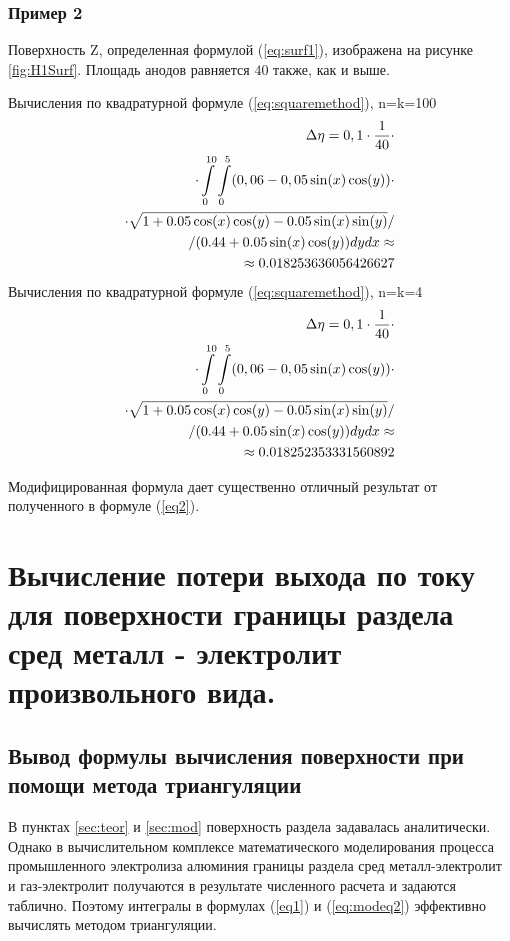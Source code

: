 \documentclass{article}
\begin{document}
\subsubsection*{Пример 2}

Поверхность Z, определенная формулой (\ref{eq:surf1}), изображена на рисунке \ref{fig:H1Surf}. Площадь анодов равняется $40$ также, как и выше.

Вычисления по квадратурной формуле (\ref{eq:squaremethod}), n=k=100
\begin{align}
\Delta \eta = 0,1 \cdot \frac{1}{40} \cdot \notag \\
\cdot \int\limits_0^{10} \int\limits_0^5 (0,06 - 0,05 \sin(x)\cos(y)) \cdot \notag \\
\cdot \sqrt{1+0.05 \cos(x)\cos(y)-0.05 \sin(x)\sin(y)}/ \notag \\
/(0.44 + 0.05 \sin(x)\cos(y)) dy dx \approx \notag \\ \approx 0.018253636056426627
\end{align}
Вычисления по квадратурной формуле (\ref{eq:squaremethod}), n=k=4
\begin{align}
\Delta \eta = 0,1 \cdot \frac{1}{40} \cdot \notag \\
\cdot \int\limits_0^{10} \int\limits_0^5 (0,06 - 0,05 \sin(x)\cos(y)) \cdot \notag \\
\cdot \sqrt{1+0.05\cos(x)\cos(y)-0.05\sin(x)\sin(y)}/ \notag \\
/(0.44 + 0.05\sin(x)\cos(y)) dy dx \approx \notag \\ \approx 0.018252353331560892
\end{align}

Модифицированная формула дает существенно отличный результат от полученного в формуле (\ref{eq2}).

\section{Вычисление потери выхода по току для поверхности границы раздела сред металл - электролит произвольного вида.}
\subsection{Вывод формулы вычисления поверхности при помощи метода триангуляции}

В пунктах \ref{sec:teor} и \ref{sec:mod} поверхность раздела задавалась аналитически. Однако в вычислительном комплексе математического моделирования процесса промышленного электролиза алюминия границы раздела сред металл-электролит и газ-электролит получаются в результате численного расчета и задаются таблично. Поэтому интегралы в формулах (\ref{eq1}) и (\ref{eq:modeq2}) эффективно вычислять методом триангуляции.
\end{document}
